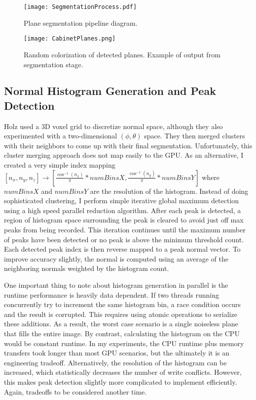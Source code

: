 \begin{figure}[!hp]
    \centering
    \texttt{[image: SegmentationProcess.pdf]}
    \caption{Plane segmentation pipeline diagram.}
    \label{fig:segmentationdiagram}
\end{figure}

\begin{figure}[!htbp]
    \centering
    \texttt{[image: CabinetPlanes.png]}
    \caption{Random colorization of detected planes. Example of output from segmentation stage.}
    \label{fig:segmentationoutput}
\end{figure}

\subsection{Normal Histogram Generation and Peak Detection}
Holz\cite{holz2012real} used a 3D voxel grid to discretize normal space, although they also experimented with a two-dimensional $(\phi,\theta)$ space. They then merged clusters with their neighbors to come up with their final segmentation. Unfortunately, this cluster merging approach does not map easily to the GPU. As an alternative, I created a very simple index mapping $[n_x,n_y,n_z] \to [\frac{\cos^{-1}(n_x)}{\pi}*numBinsX,\frac{\cos^{-1}(n_y)}{\pi}*numBinsY]$ where $numBinsX$ and $numBinsY$ are the resolution of the histogram. Instead of doing sophisticated clustering, I perform simple iterative global maximum detection using a high speed parallel reduction algorithm. After each peak is detected, a region of histogram space surrounding the peak is cleared to avoid just off max peaks from being recorded. This iteration continues until the maximum number of peaks have been detected or no peak is above the minimum threshold count. Each detected peak index is then reverse mapped to a peak normal vector. To improve accuracy slightly, the normal is computed using an average of the neighboring normals weighted by the histogram count.\par
One important thing to note about histogram generation in parallel is the runtime performance is heavily data dependent. If two threads running concurrently try to increment the same histogram bin, a race condition occurs and the result is corrupted. This requires using atomic operations to serialize these additions. As a result, the worst case scenario is a single noiseless plane that fills the entire image. By contrast, calculating the histogram on the CPU would be constant runtime. In my experiments, the CPU runtime plus memory transfers took longer than most GPU scenarios, but the ultimately it is an engineering tradeoff. Alternatively, the resolution of the histogram can be increased, which statistically decreases the number of write conflicts. However, this makes peak detection slightly more complicated to implement efficiently. Again, tradeoffs to be considered another time.
